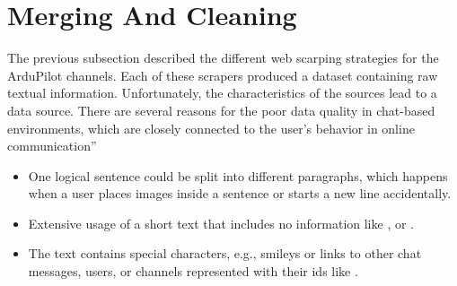 \section{Merging And Cleaning}\label{sec:merging-and-cleaning}
The previous subsection described the different web scarping strategies for the ArduPilot channels.
Each of these scrapers produced a dataset containing raw textual information.
Unfortunately, the characteristics of the sources lead to a  data source.
There are several reasons for the poor data quality in chat-based environments, which are closely connected to the user's behavior in online communication''
\begin{itemize}
    \item One logical sentence could be split into different paragraphs, which happens when a user places images inside a sentence or starts a new line accidentally.
    \item Extensive usage of a short text that includes no information like ,  or .
    \item The text contains special characters, e.g., smileys or links to other chat messages, users, or channels represented with their ids like .
\end{itemize}

